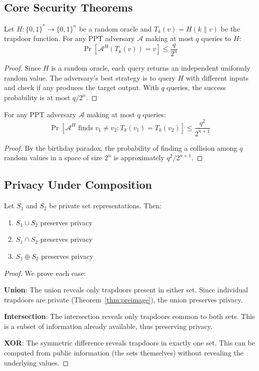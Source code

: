\documentclass[../main_comprehensive.tex]{subfiles}
\begin{document}
\subsection{Core Security Theorems}

\begin{theorem}
\label{thm:preimage}
Let $H: \{0,1\}^* \rightarrow \{0,1\}^n$ be a random oracle and $T_k(v) = H(k \| v)$ be the trapdoor function. For any PPT adversary $\mathcal{A}$ making at most $q$ queries to $H$:
$$\Pr[\mathcal{A}^H(T_k(v)) = v] \leq \frac{q}{2^n}$$
\end{theorem}

\begin{proof}
Since $H$ is a random oracle, each query returns an independent uniformly random value. The adversary's best strategy is to query $H$ with different inputs and check if any produces the target output. With $q$ queries, the success probability is at most $q/2^n$.
\end{proof}

\begin{theorem}
For any PPT adversary $\mathcal{A}$ making at most $q$ queries:
$$\Pr[\mathcal{A}^H \text{ finds } v_1 \neq v_2 : T_k(v_1) = T_k(v_2)] \leq \frac{q^2}{2^{n+1}}$$
\end{theorem}

\begin{proof}
By the birthday paradox, the probability of finding a collision among $q$ random values in a space of size $2^n$ is approximately $q^2/2^{n+1}$.
\end{proof}

\subsection{Privacy Under Composition}

\begin{theorem}
Let $S_1$ and $S_2$ be private set representations. Then:
\begin{enumerate}
\item $S_1 \cup S_2$ preserves privacy
\item $S_1 \cap S_2$ preserves privacy
\item $S_1 \oplus S_2$ preserves privacy
\end{enumerate}
\end{theorem}

\begin{proof}
We prove each case:

\textbf{Union}: The union reveals only trapdoors present in either set. Since individual trapdoors are private (Theorem~\ref{thm:preimage}), the union preserves privacy.

\textbf{Intersection}: The intersection reveals only trapdoors common to both sets. This is a subset of information already available, thus preserving privacy.

\textbf{XOR}: The symmetric difference reveals trapdoors in exactly one set. This can be computed from public information (the sets themselves) without revealing the underlying values.
\end{proof}
\end{document}
